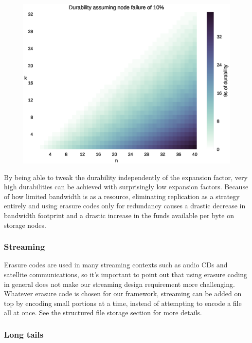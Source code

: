 \documentclass[a4paper,10pt]{article} \usepackage[utf8]{inputenc}
\begin{document}
\begin{figure} \centering
\includegraphics[width=\linewidth]{durability/durability.eps}\label{fig:durability}
\end{figure}

By being able to tweak the durability independently of the expansion factor,
very high durabilities can be achieved with surprisingly low expansion factors.
Because of how limited bandwidth is as a resource, eliminating replication as a
strategy entirely and using erasure codes only for redundancy causes a drastic
decrease in bandwidth footprint and a drastic increase in the funds available
per byte on storage nodes.

\subsubsection{Streaming}

Erasure codes are used in many streaming contexts such as audio CDs and
satellite communications, so it's important to point out that using erasure
coding in general does not make our streaming design requirement more
challenging. Whatever erasure code is chosen for our framework, streaming can be
added on top by encoding small portions at a time, instead of attempting to
encode a file all at once. See the structured file storage section for more
details.

\subsubsection{Long tails}
\end{document}
